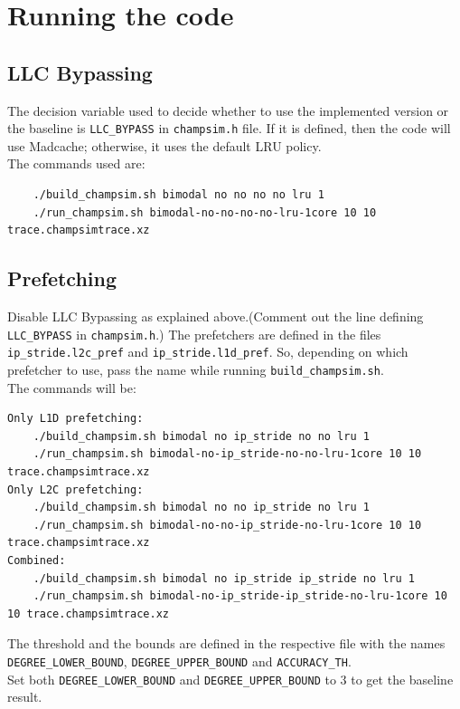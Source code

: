 \documentclass[11pt, swedish, openany]{book}
\begin{document}
\chapter{Running the code}
\section{LLC Bypassing}
The decision variable used to decide whether to use the implemented version or the baseline is \texttt{LLC\_BYPASS} in \texttt{champsim.h} file. If it is defined, then the code will use Madcache; otherwise, it uses the default LRU policy.\\
The commands used are:
\begin{verbatim}
    ./build_champsim.sh bimodal no no no no lru 1
    ./run_champsim.sh bimodal-no-no-no-no-lru-1core 10 10 trace.champsimtrace.xz
\end{verbatim}

\section{Prefetching}
Disable LLC Bypassing as explained above.(Comment out the line defining \texttt{LLC\_BYPASS} in \texttt{champsim.h}.) The prefetchers are defined in the files \texttt{ip\_stride.l2c\_pref} and \texttt{ip\_stride.l1d\_pref}. So, depending on which prefetcher to use, pass the name while running \texttt{build\_champsim.sh}.\\
The commands will be:
\begin{verbatim}
Only L1D prefetching:
    ./build_champsim.sh bimodal no ip_stride no no lru 1
    ./run_champsim.sh bimodal-no-ip_stride-no-no-lru-1core 10 10 trace.champsimtrace.xz
Only L2C prefetching:
    ./build_champsim.sh bimodal no no ip_stride no lru 1
    ./run_champsim.sh bimodal-no-no-ip_stride-no-lru-1core 10 10 trace.champsimtrace.xz
Combined:
    ./build_champsim.sh bimodal no ip_stride ip_stride no lru 1
    ./run_champsim.sh bimodal-no-ip_stride-ip_stride-no-lru-1core 10 10 trace.champsimtrace.xz
\end{verbatim}
The threshold and the bounds are defined in the respective file with the names \texttt{DEGREE\_LOWER\_BOUND}, \texttt{DEGREE\_UPPER\_BOUND} and \texttt{ACCURACY\_TH}. \\
Set both \texttt{DEGREE\_LOWER\_BOUND} and \texttt{DEGREE\_UPPER\_BOUND} to $3$ to get the baseline result.



\end{document}
